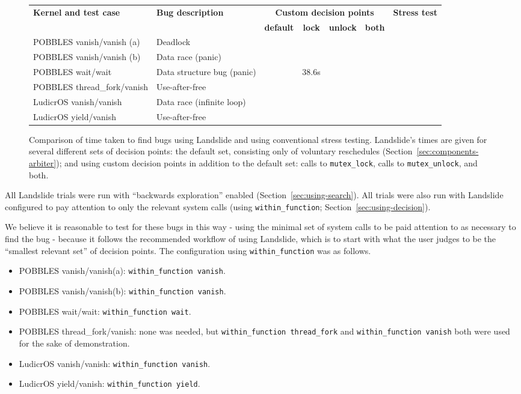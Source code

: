 \begin{figure*}[t!]
	\begin{tabular}{|l|l||c|c|c|c||c|}
		\hline
		\multirow{2}{*}{\bf Kernel and test case} & \multirow{2}{*}{\bf Bug description} & \multicolumn{4}{c||}{\bf Custom decision points} & \multirow{2}{*}{\bf Stress test} \\
		\cline{3-6}
		& & \bf default & \bf lock & \bf unlock & \bf both & \\
		\hline\hline
		POBBLES vanish/vanish (a) & Deadlock & & & & & \\
		\hline
		POBBLES vanish/vanish (b) & Data race (panic) & & & & & \\
		\hline
		POBBLES wait/wait & Data structure bug (panic) & & 38.6s & & & \\
		\hline
		POBBLES thread\_fork/vanish & Use-after-free & & & & & \\
		\hline
		LudicrOS vanish/vanish & Data race (infinite loop) & & & & & \\
		\hline
		LudicrOS yield/vanish & Use-after-free & & & & & \\
		\hline
	\end{tabular}
	\caption{Comparison of time taken to find bugs using Landslide and using conventional stress testing.
	Landslide's times are given for several different sets of decision points: the default set, consisting only of voluntary reschedules (Section~\ref{sec:components-arbiter}); and using custom decision points in addition to the default set: calls to \texttt{mutex\_lock}, calls to \texttt{mutex\_unlock}, and both.}
	\label{fig:numbers}
\end{figure*}

All Landslide trials were run with ``backwards exploration'' enabled (Section~\ref{sec:using-search}).
All trials were also run with Landslide configured to pay attention to only the relevant system calls (using \texttt{within\_function}; Section~\ref{sec:using-decision}).

We believe it is reasonable to test for these bugs in this way - using the minimal set of system calls to be paid attention to as necessary to find the bug - because it follows the recommended workflow of using Landslide, which is to start with what the user judges to be the ``smallest relevant set'' of decision points. The configuration using \texttt{within\_function} was as follows.

\begin{itemize}
	\item POBBLES vanish/vanish(a): \texttt{within\_function vanish}.
	\item POBBLES vanish/vanish(b): \texttt{within\_function vanish}.
	\item POBBLES wait/wait: \texttt{within\_function wait}.
	\item POBBLES thread\_fork/vanish: none was needed, but \texttt{within\_function thread\_fork} and \texttt{within\_function vanish} both were used for the sake of demonstration.
	\item LudicrOS vanish/vanish: \texttt{within\_function vanish}.
	\item LudicrOS yield/vanish: \texttt{within\_function yield}.
\end{itemize}

